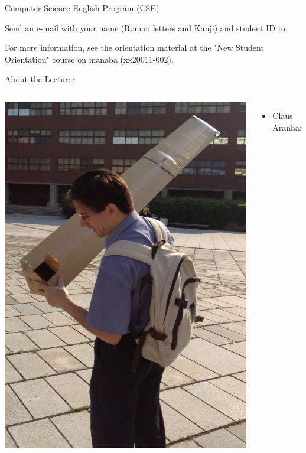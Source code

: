 \documentclass{beamer}
\begin{document}
\begin{CJK}{UTF8}{ipxm}
\begin{frame}{Computer Science English Program (CSE)}
  \begin{center}
    Send an e-mail with your name (Roman letters and Kanji) and student ID to\\
  \end{center}
  \bigskip

  For more information, see the orientation material at the
  "New Student Orientation" course on manaba (xx20011-002).
\end{frame}

\begin{frame}{About the Lecturer}
  \begin{columns}
    \includegraphics[width=1\textwidth]{../img/pinhole}
    {\small
    \begin{itemize}
      \item {} Claus Aranha;

\end{itemize}}
\end{columns}
\end{frame}
\end{CJK}
\end{document}
